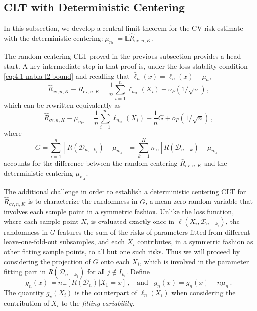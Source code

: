 \documentclass[11pt]{article}
\theoremstyle{plain}
\newcommand{\cv}{{\mathrm{cv}}}
\newcommand{\tr}{{\mathrm{tr}}}
\newcommand{\te}{{\mathrm{te}}}
\newcommand{\D}{{\mathcal{D}}}
\begin{document}
\subsection{CLT with Deterministic Centering}\label{subsec:4.2-cv-clt-det}
In this subsection, we develop a central limit theorem for the CV risk estimate with the deterministic centering: $\mu_{n_\tr}=\mathbb E\hat R_{\cv,n,K}$.

The random centering CLT proved in the previous subsection provides a head start. A key intermediate step in that proof is, under the loss stability condition \eqref{eq:4.1-nabla-l2-bound} and recalling that $\bar\ell_n(x)=\ell_n(x)-\mu_n$,
$$
\hat R_{\cv,n,K} - \bar R_{\cv,n,K} = \frac{1}{n}\sum_{i=1}^n\bar\ell_{n_\tr}(X_i) +o_P(1/\sqrt{n})\,,
$$
which can be rewritten equivalently as
\begin{equation}
\label{eq:4.2-asymp-lin-with-G}
\hat R_{\cv,n,K} - \mu_{n_\tr} = \frac{1}{n}\sum_{i=1}^n\bar\ell_{n_\tr}(X_i)+\frac{1}{n} G+o_P(1/\sqrt{n})\,,
\end{equation}
where
\begin{equation}\label{eq:4.2-def-G}
G = \sum_{i=1}^n \left[R(\D_{n,-k_i})-\mu_{n_\tr}\right] = \sum_{k=1}^K n_\te \left[R(\D_{n,-k})-\mu_{n_\tr}\right]
\end{equation}
accounts for the difference between the random centering $\bar R_{\cv,n,K}$ and the deterministic centering $\mu_{n_\tr}$.

The additional challenge in order to establish a deterministic centering CLT for $\hat R_{\cv,n,K}$ is to characterize the randomness in $G$, a mean zero random variable that involves each sample point in a symmetric fashion.
Unlike the loss function, where each sample point $X_i$ is evaluated exactly once in $\ell(X_i,\D_{n,-k_i})$, the randomness in $G$ features the sum of the risks of parameters fitted from different leave-one-fold-out subsamples, and each $X_i$ contributes, in a symmetric fashion as other fitting sample points, to all but one such risks.  Thus we will proceed by considering the projection of $G$ onto each $X_i$, which is involved in the parameter fitting part in $R(\D_{n,-k_j})$ for all $j\notin I_{k_i}$. Define
\begin{equation}\label{eq:4.2-g}
g_n(x) \coloneqq n\mathbb E\left[R(\D_n)|X_1=x\right]\,,~~~~\text{and}~~~~ \bar g_n(x)=g_n(x)-n\mu_n\,.
\end{equation}
The quantity $g_n(X_i)$ is the counterpart of $\ell_n(X_i)$ when considering the contribution of $X_i$ to the \emph{fitting variability}.
\end{document}

